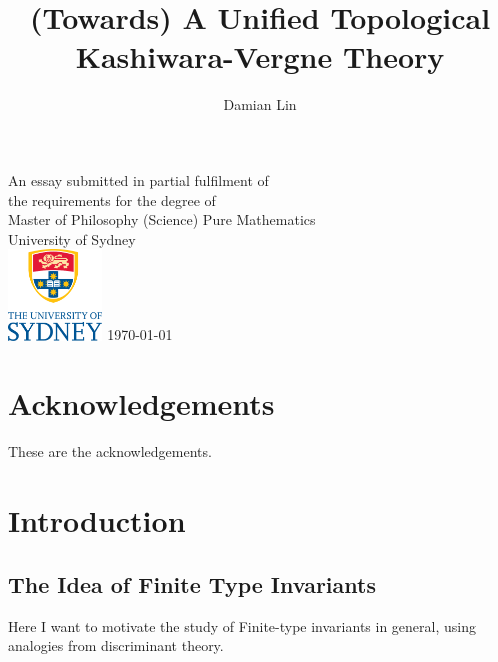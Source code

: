 \documentclass[12pt]{report}
\theoremstyle{regular}
\newcommand{\draftnote}[1]{
\begin{mdframed}[style=draftnote]
        {\color{Gray}{\scshape Note:} #1 }
\end{mdframed}
}
\begin{document}

        \author{Damian Lin}
        \title{(Towards) A Unified Topological Kashiwara-Vergne Theory}

        \cleardoublepage \thispagestyle{empty}
        \null \vfil
        \begingroup
        \LARGE \bfseries \centering
        \openup \medskipamount
        \thetitle \par \vspace{30pt}
        \centering \mdseries \theauthor \par \bigskip
        \endgroup
        \vfil \vfil \vfil
        \begin{center}
                An essay submitted in partial fulfilment of\\
                the requirements for the degree of\\
                Master of Philosophy (Science)
                \vfil\vfil
                {\large Pure Mathematics\\[5pt]
                        University of Sydney}\\
                \vskip6mm
                \includegraphics[width=25mm]{graphics/USY_MB1_CMYK_Stacked_Logo.pdf}
                \vfil
                \normalsize\today
        \end{center}
        \vfil
        \cleardoublepage

        \tableofcontents

        \chapter*{Acknowledgements}

        These are the acknowledgements.

        \chapter*{Introduction}

        \section*{The Idea of Finite Type Invariants}
        \draftnote{Here I want to motivate the study of Finite-type invariants in general, using analogies from discriminant theory.}
\end{document}
